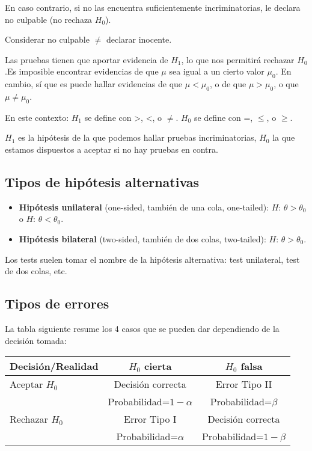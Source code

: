 \documentclass[
]{article}
\providecommand{\tightlist}{%
  \setlength{\itemsep}{0pt}\setlength{\parskip}{0pt}}
\begin{document}
En caso contrario, si no las encuentra suficientemente incriminatorias,
le declara no culpable (no rechaza \(H_0\)).

Considerar no culpable \(\neq\) declarar inocente.

Las pruebas tienen que aportar evidencia de \(H_1\), lo que nos
permitirá rechazar \(H_0\).Es imposible encontrar evidencias de que
\(\mu\) sea igual a un cierto valor \(\mu_0\). En cambio, sí que es
puede hallar evidencias de que \(\mu < \mu_0\), o de que
\(\mu > \mu_0\), o que \(\mu \neq \mu_0\).

En este contexto: \(H_1\) se define con \textgreater, \textless, o
\(\neq\). \(H_0\) se define con =, \(\leq\), o \(\geq\).

\(H_1\) es la hipótesis de la que podemos hallar pruebas
incriminatorias, \(H_0\) la que estamos dispuestos a aceptar si no hay
pruebas en contra.

\hypertarget{tipos-de-hipuxf3tesis-alternativas}{%
\subsection{Tipos de hipótesis
alternativas}\label{tipos-de-hipuxf3tesis-alternativas}}

\begin{itemize}
\tightlist
\item
  \textbf{Hipótesis unilateral} (one-sided, también de una cola,
  one-tailed): \(H\): \(\theta > \theta_0\) o \(H\):
  \(\theta < \theta_0\).
\item
  \textbf{Hipótesis bilateral} (two-sided, también de dos colas,
  two-tailed): \(H\): \(\theta > \theta_0\).
\end{itemize}

Los tests suelen tomar el nombre de la hipótesis alternativa: test
unilateral, test de dos colas, etc.

\hypertarget{tipos-de-errores}{%
\subsection{Tipos de errores}\label{tipos-de-errores}}

La tabla siguiente resume los 4 casos que se pueden dar dependiendo de
la decisión tomada:

\begin{longtable}[]{@{}lcc@{}}
\toprule
Decisión/Realidad & \(H_0\) cierta & \(H_0\) falsa\tabularnewline
\midrule
\endhead
Aceptar \(H_0\) & Decisión correcta & Error Tipo II\tabularnewline
& Probabilidad=\(1-\alpha\) & Probabilidad=\(\beta\)\tabularnewline
Rechazar \(H_0\) & Error Tipo I & Decisión correcta\tabularnewline
& Probabilidad=\(\alpha\) & Probabilidad=\(1-\beta\)\tabularnewline
\bottomrule
\end{longtable}
\end{document}
